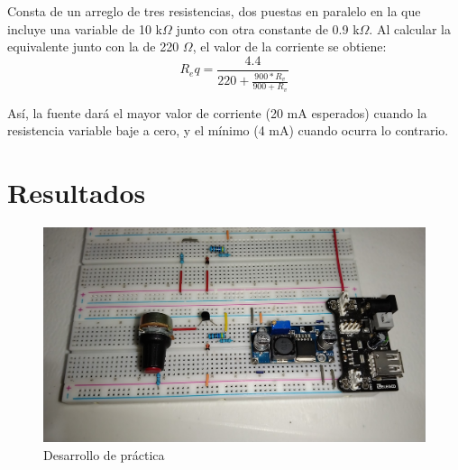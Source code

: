 \documentclass{article}
\begin{document}
Consta de un arreglo de tres resistencias, dos puestas en paralelo en la que incluye una variable de 10 k\(\Omega\) junto con
otra constante de 0.9 k\(\Omega\). Al calcular la equivalente junto con la de 220 \(\Omega\), el valor de la corriente se obtiene:
\[ R_eq = \frac{4.4}{220 + \frac{900*R_v}{900 + R_v}} \]

Así, la fuente dará el mayor valor de corriente (20 mA esperados) cuando la resistencia variable baje a cero, y el mínimo (4 mA)
cuando ocurra lo contrario.

\section{Resultados}

\begin{figure}[htb]
    \centering
    \includegraphics[scale=0.1]{IMG_20220303_191602.jpg}
    \caption{Desarrollo de práctica}
    \label{Fig: Desarrollo de práctica 1}
\end{figure}
\end{document}
